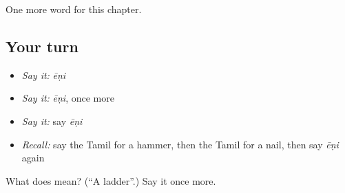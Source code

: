 \begin{grammarlens}[title={What you've built}]
One more word for this chapter.
\end{grammarlens}

\subsection*{Your turn}
\begin{itemize}
\raggedright
  \item \emph{Say it:} \emph{ēṇi}
  \item \emph{Say it:} \emph{ēṇi}, once more
  \item \emph{Say it:} say \emph{ēṇi}
  \item \emph{Recall:} say the Tamil for a hammer, then the Tamil for a nail, then say \emph{ēṇi} again
\end{itemize}

\begin{tcolorbox}[breakable,colback=teal!4,colframe=teal!35!black,title={Before you move on}]
What does  mean? (\textquotedblleft{}A ladder\textquotedblright{}.) Say it once more.
\end{tcolorbox}
